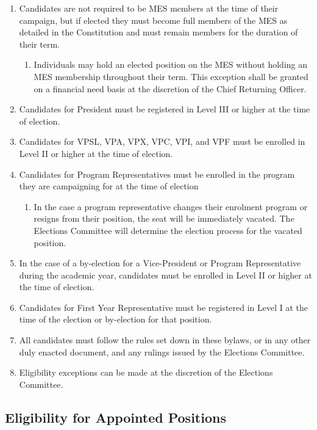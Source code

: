 \begin{enumerate}
 \item
  Candidates are not required to be MES members at the time of their campaign, but if elected they must become full members of the MES as detailed in the Constitution and must remain members for the duration of their term.

  \begin{enumerate}
   \item
    Individuals may hold an elected position on the MES without holding an MES membership throughout their term. This exception shall be granted on a financial need basis at the discretion of the Chief Returning Officer.
  \end{enumerate}
 \item
  Candidates for President must be registered in Level III or higher at the time of election.
 \item
  Candidates for VPSL, VPA, VPX, VPC, VPI, and VPF must be enrolled in Level II or higher at the time of election.
 \item
  Candidates for Program Representatives must be enrolled in the program they are campaigning for at the time of election

  \begin{enumerate}
   \item
    In the case a program representative changes their enrolment program or resigns from their position, the seat will be immediately vacated. The Elections Committee will determine the election process for the vacated position.
  \end{enumerate}
 \item
  In the case of a by-election for a Vice-President or Program Representative during the academic year, candidates must be enrolled in Level II or higher at the time of election.
 \item
  Candidates for First Year Representative must be registered in Level I at the time of the election or by-election for that position.
 \item
  All candidates must follow the rules set down in these bylaws, or in any other duly enacted document, and any rulings issued by the Elections Committee.
 \item
  Eligibility exceptions can be made at the discretion of the Elections Committee.
\end{enumerate}

\subsection{Eligibility for Appointed Positions}
\label{eligibility-for-appointed-positions}

